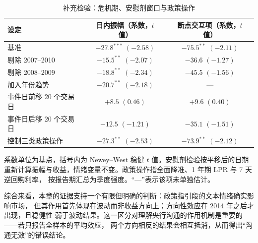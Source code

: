 \begin{table}[htbp]
\centering
\small
\begin{threeparttable}
\caption{补充检验：危机期、安慰剂窗口与政策操作}
\label{tab:robust2}
\begin{tabular}{lcc}
\toprule
设定 & 日内振幅（系数，$t$ 值） & 断点交互项（系数，$t$ 值） \\
\midrule
基准 & $-27.8^{***}$ $(-2.58)$ & $-75.5^{**}$ $(-2.11)$ \\
剔除 2007--2010 & $-15.5^{**}$ $(-2.07)$ & $-36.6$ $(-1.27)$ \\
剔除 2008--2009 & $-18.8^{**}$ $(-2.34)$ & $-45.5$ $(-1.56)$ \\
加入年份趋势 & $-20.7^{**}$ $(-2.18)$ & — \\
事件日前移 20 个交易日 & $+8.5$ $(0.46)$ & $+9.6$ $(0.40)$ \\
事件日后移 20 个交易日 & $-12.5$ $(-1.21)$ & $-35.1$ $(-1.51)$ \\
控制三类政策操作 & $-27.3^{**}$ $(-2.53)$ & $-73.9^{**}$ $(-2.12)$ \\
\bottomrule
\end{tabular}
\begin{tablenotes}[flushleft]
\footnotesize
\item 系数单位为基点，括号内为 Newey--West 稳健 $t$ 值。安慰剂检验按平移后的日期
重新计算振幅与收益，情绪变量不变。政策操作指全面降准、1 年期 LPR 与 7 天逆回购利率，
按报告期汇总为季度强度。``—''表示该项未单独估计。
\end{tablenotes}
\end{threeparttable}
\end{table}

综合来看，本章的证据支持一个有限但明确的判断：政策指引段的文本情绪确实影响市场，
但其作用首先体现在波动而非收益方向上；方向性效应在 2014 年之后才出现，且稳健性
弱于波动结果。这一区分对理解央行沟通的作用机制是重要的——若只报告全样本的平均效应，
两个方向相反的结果会相互抵消，从而得出``沟通无效''的错误结论。
